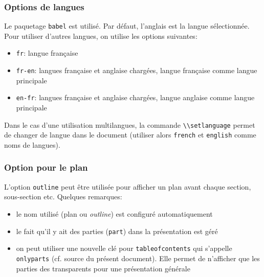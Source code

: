 \documentclass[fr,biblatex,outline]{isae-slides}
\begin{document}
\begin{frame}
\frametitle{Options de langues}

\vfill

Le paquetage \lstinline!babel! est utilisé. Par défaut, l'anglais est
la langue sélectionnée. Pour utiliser d'autres langues, on utilise les
options suivantes:

\begin{itemize}
\item \lstinline!fr!: langue française
\item \lstinline!fr-en!: langues française et anglaise chargées,
  langue française comme langue principale
\item \lstinline!en-fr!: langues française et anglaise chargées,
  langue anglaise comme langue principale
\end{itemize}

\vfill

Dans le cas d'une utilisation multilangues, la commande
\lstinline!\\setlanguage! permet de changer de langue dans le document
(utiliser alors \lstinline!french! et \lstinline!english! comme noms
de langues).

\vfill

\end{frame}

\begin{frame}
\frametitle{Option pour le plan}

\vfill

L'option \lstinline!outline! peut être utilisée pour afficher un plan
avant chaque section, sous-section etc. Quelques remarques:

\begin{itemize}
\item le nom utilisé (plan ou \textit{outline}) est configuré
  automatiquement
\item le fait qu'il y ait des parties (\lstinline!part!) dans la
  présentation est géré
\item on peut utiliser une nouvelle clé pour
  \lstinline!tableofcontents! qui s'appelle \lstinline!onlyparts!
  (cf. source du présent document). Elle permet de n'afficher que les
  parties des transparents pour une présentation générale
\end{itemize}

\vfill

\end{frame}
\end{document}
